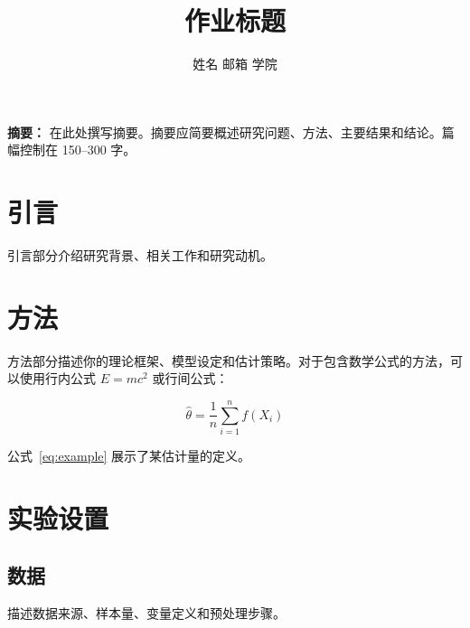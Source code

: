 \documentclass[12pt, a4paper]{ctexart}
\title{\vspace{-1.5em}作业标题\vspace{-0.5em}}
\author{姓名 \quad 邮箱 \quad 学院}
\date{}
\begin{document}
\maketitle
\vspace{-0.8em}

\noindent\textbf{摘要：}%
在此处撰写摘要。摘要应简要概述研究问题、方法、主要结果和结论。篇幅控制在 150--300 字。

\vspace{1em}

\section{引言}

引言部分介绍研究背景、相关工作和研究动机。

\section{方法}

方法部分描述你的理论框架、模型设定和估计策略。对于包含数学公式的方法，可以使用行内公式 \(E = mc^2\) 或行间公式：

\begin{equation}
    \hat{\theta} = \frac{1}{n} \sum_{i=1}^{n} f(X_i)
    \label{eq:example}
\end{equation}

公式~\eqref{eq:example} 展示了某估计量的定义。

\section{实验设置}

\subsection{数据}

描述数据来源、样本量、变量定义和预处理步骤。

%
\end{document}

